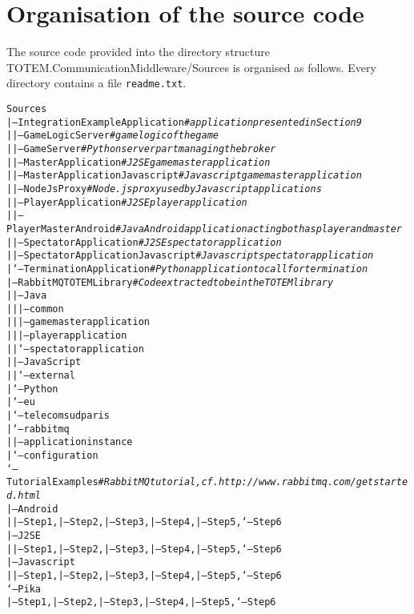 
\section{Organisation of the source code}
\label{S_sourcecode}

The source code provided into the directory structure
\textsf{TOTEM.CommunicationMiddleware/Sources} is organised as
follows. Every directory contains a file \texttt{readme.txt}.

\begin{small}
\begin{alltt}

Sources
|-- IntegrationExampleApplication      \textit{# application presented in Section 9}
|   |-- GameLogicServer                \textit{# game logic of the game}
|   |-- GameServer                     \textit{# Python server part managing the broker}
|   |-- MasterApplication              \textit{# J2SE game master application}
|   |-- MasterApplicationJavascript    \textit{# Javascript game master application}
|   |-- NodeJsProxy                    \textit{# Node.js proxy used by Javascript applications}
|   |-- PlayerApplication              \textit{# J2SE player application}
|   |-- PlayerMasterAndroid            \textit{# Java Android application acting both as player and master}
|   |-- SpectatorApplication           \textit{# J2SE spectator application}
|   |-- SpectatorApplicationJavascript \textit{# Javascript spectator application}
|   `-- TerminationApplication         \textit{# Python application to call for termination}
|-- RabbitMQTOTEMLibrary               \textit{# Code extracted to be in the TOTEM library}
|   |-- Java
|   |   |-- common
|   |   |-- gamemasterapplication
|   |   |-- playerapplication
|   |   `-- spectatorapplication
|   |-- JavaScript
|   |    `-- external
|   `-- Python
|       `-- eu
|           `-- telecomsudparis
|               `-- rabbitmq
|                   |-- applicationinstance
|                   `-- configuration
`-- TutorialExamples       \textit{# RabbitMQ tutorial, cf. http://www.rabbitmq.com/getstarted.html}
    |-- Android
    |   |-- Step1, |-- Step2, |-- Step3, |-- Step4, |-- Step5, `-- Step6
    |-- J2SE
    |   |-- Step1, |-- Step2, |-- Step3, |-- Step4, |-- Step5, `-- Step6
    |-- Javascript
    |   |-- Step1, |-- Step2, |-- Step3, |-- Step4, |-- Step5, `-- Step6
    `-- Pika
        |-- Step1, |-- Step2, |-- Step3, |-- Step4, |-- Step5, `-- Step6

\end{alltt}
\end{small}

\endinput
